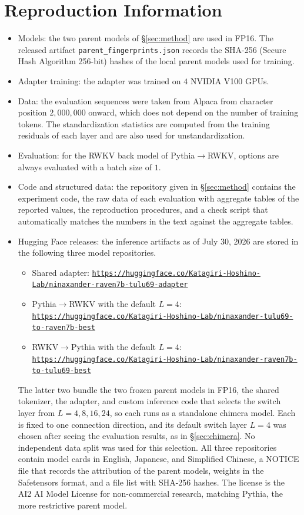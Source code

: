 \documentclass[conference]{IEEEtran}
\newcommand{\RtoP}{RWKV$\to$\allowbreak Pythia}
\newcommand{\PtoR}{Pythia$\to$\allowbreak RWKV}
\newcommand{\hfrepo}[2]{%
  \href{#1}{%
    \texttt{https://huggingface.co/}\allowbreak\texttt{Katagiri-Hoshino-Lab/}\allowbreak\texttt{#2}}}
\begin{document}
\appendix
\section{Reproduction Information}\label{sec:repro}
\begin{itemize}\setlength{\itemsep}{1pt}\raggedright
\item Models: the two parent models of \S\ref{sec:method} are used in FP16. The released artifact
\texttt{parent\_fingerprints.json} records the SHA-256 (Secure Hash Algorithm 256-bit) hashes of the local parent models used for training.
\item Adapter training: the adapter was trained on $4$ NVIDIA V100 GPUs.
\item Data: the evaluation sequences were taken from Alpaca from character position $2{,}000{,}000$ onward, which does not depend on
the number of training tokens. The standardization statistics are computed from the training residuals of each layer
and are also used for unstandardization.
\item Evaluation: for the RWKV back model of \PtoR{}, options are always evaluated with a batch size of $1$.
\item Code and structured data: the repository given in \S\ref{sec:method} contains the experiment code, the raw data of each
evaluation with aggregate tables of the reported values, the reproduction procedures, and a check script that automatically matches the numbers in the text against the aggregate tables.
\item Hugging Face releases: the inference artifacts as of July 30, 2026 are stored in the following three model repositories.
\begin{itemize}\setlength{\itemsep}{0pt}\raggedright
\item Shared adapter: \hfrepo
  {https://huggingface.co/Katagiri-Hoshino-Lab/ninaxander-raven7b-tulu69-adapter}
  {ninaxander-raven7b-tulu69-adapter}
\item \PtoR{} with the default $L{=}4$: \hfrepo
  {https://huggingface.co/Katagiri-Hoshino-Lab/ninaxander-tulu69-to-raven7b-best}
  {ninaxander-tulu69-to-raven7b-best}
\item \RtoP{} with the default $L{=}4$: \hfrepo
  {https://huggingface.co/Katagiri-Hoshino-Lab/ninaxander-raven7b-to-tulu69-best}
  {ninaxander-raven7b-to-tulu69-best}
\end{itemize}
The latter two bundle the two frozen parent models in FP16, the shared tokenizer, the adapter, and custom inference code that selects the switch
layer from $L{=}4,8,16,24$, so each runs as a standalone chimera model. Each is fixed to one connection direction, and its default switch layer
$L{=}4$ was chosen after seeing the evaluation results, as in \S\ref{sec:chimera}. No independent data split was used for this selection.
All three repositories contain model cards in English, Japanese, and Simplified Chinese, a NOTICE file that records the attribution
of the parent models, weights in the Safetensors format, and a file list with SHA-256 hashes. The license is the AI2 AI Model License
for non-commercial research, matching Pythia, the more restrictive parent model.
\end{itemize}
\end{document}
